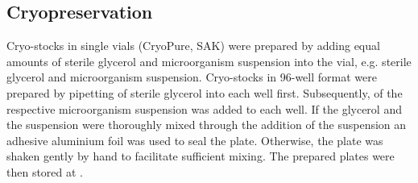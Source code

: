 \subsection{Cryopreservation}
Cryo-stocks in single vials (CryoPure, SAK) were prepared by adding equal amounts of sterile  glycerol and microorganism suspension into the vial, e.g.  sterile  glycerol and  microorganism suspension. %
Cryo-stocks in 96-well format were prepared by pipetting  of sterile  glycerol into each well first. Subsequently,  of the respective microorganism suspension was added to each well. If the glycerol and the suspension were thoroughly mixed through the addition of the suspension an adhesive aluminium foil was used to seal the plate. Otherwise, the plate was shaken gently by hand to facilitate sufficient mixing. The prepared plates were then stored at .

